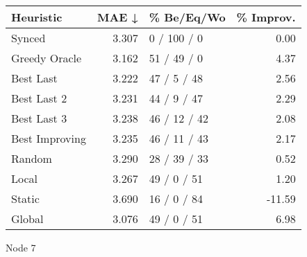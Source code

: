 \begin{tabular}{lrlr}
\toprule
\textbf{Heuristic} & \textbf{MAE ↓} & \textbf{\% Be/Eq/Wo} & \textbf{\% Improv.} \\
\midrule
            Synced &          3.307 &          0 / 100 / 0 &                0.00 \\
     Greedy Oracle &          3.162 &          51 / 49 / 0 &                4.37 \\
         Best Last &          3.222 &          47 / 5 / 48 &                2.56 \\
       Best Last 2 &          3.231 &          44 / 9 / 47 &                2.29 \\
       Best Last 3 &          3.238 &         46 / 12 / 42 &                2.08 \\
    Best Improving &          3.235 &         46 / 11 / 43 &                2.17 \\
            Random &          3.290 &         28 / 39 / 33 &                0.52 \\
             Local &          3.267 &          49 / 0 / 51 &                1.20 \\
            Static &          3.690 &          16 / 0 / 84 &              -11.59 \\
            Global &          3.076 &          49 / 0 / 51 &                6.98 \\
\bottomrule
\end{tabular}
\caption{Node 7}
\label{tab:ds_iid_lr05_le1_bs4_7}
